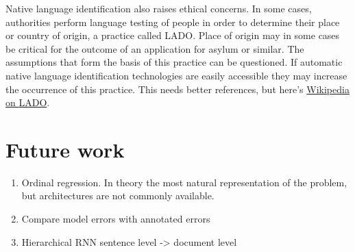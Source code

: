 Native language identification also raises ethical concerns. In some cases,
authorities perform language testing of people in order to determine their
place or country of origin, a practice called \ac{LADO}. Place of origin may
in some cases be critical for the outcome of an application
for asylum or similar. The assumptions that form the basis of this practice
can be questioned. If automatic native language identification technologies
are easily accessible they may increase the occurrence of this practice. This
needs better references, but here's
\href{https://en.wikipedia.org/wiki/Language_analysis_for_the_determination_of_origin}{Wikipedia
on \ac{LADO}}.


\section{Future work}

\begin{enumerate}
    \item Ordinal regression. In theory the most natural representation of the
          problem, but architectures are not commonly available.
    \item Compare model errors with annotated errors
    \item Hierarchical RNN sentence level -> document level
\end{enumerate}
